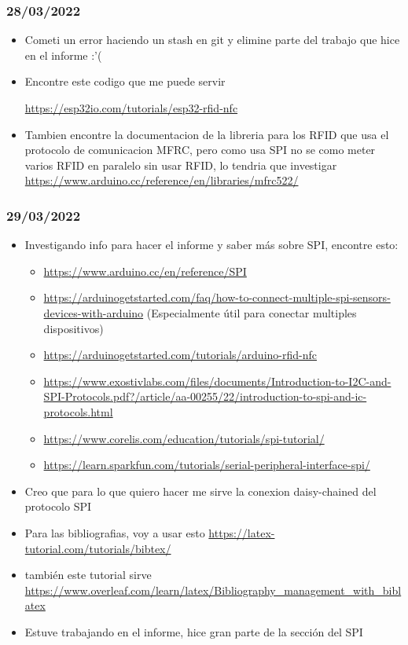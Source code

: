 \documentclass[../informe_krapp.tex]{subfiles}
\begin{document}
\subsubsection{28/03/2022}
\begin{itemize}
	\item Cometi un error haciendo un stash en git y elimine parte del trabajo que hice
	      en el informe :'(
	\item Encontre este codigo que me puede servir

	      \url{https://esp32io.com/tutorials/esp32-rfid-nfc}
	\item Tambien encontre la documentacion de la libreria para los RFID que usa el
	      protocolo de comunicacion MFRC, pero como usa SPI no se como meter varios RFID en
	      paralelo sin usar RFID, lo tendria que investigar
	      \url{https://www.arduino.cc/reference/en/libraries/mfrc522/}
\end{itemize}

\subsubsection{29/03/2022}
\begin{itemize}
	\item Investigando info para hacer el informe y saber más sobre SPI, encontre esto:
	      \begin{itemize}
		      \item \url{https://www.arduino.cc/en/reference/SPI}
		      \item \url{https://arduinogetstarted.com/faq/how-to-connect-multiple-spi-sensors-devices-with-arduino} (Especialmente útil para conectar multiples dispositivos)
		      \item \url{https://arduinogetstarted.com/tutorials/arduino-rfid-nfc}
		      \item \url{https://www.exostivlabs.com/files/documents/Introduction-to-I2C-and-SPI-Protocols.pdf?/article/aa-00255/22/introduction-to-spi-and-ic-protocols.html}
		      \item \url{https://www.corelis.com/education/tutorials/spi-tutorial/}
		      \item \url{https://learn.sparkfun.com/tutorials/serial-peripheral-interface-spi/}
	      \end{itemize}
	\item Creo que para lo que quiero hacer me sirve la conexion daisy-chained
	      del protocolo SPI
	\item Para las bibliografias, voy a usar esto \url{https://latex-tutorial.com/tutorials/bibtex/}
	\item también este tutorial sirve \url{https://www.overleaf.com/learn/latex/Bibliography_management_with_biblatex}
	\item Estuve trabajando en el informe, hice gran parte de la sección del SPI

\end{itemize}
\end{document}
